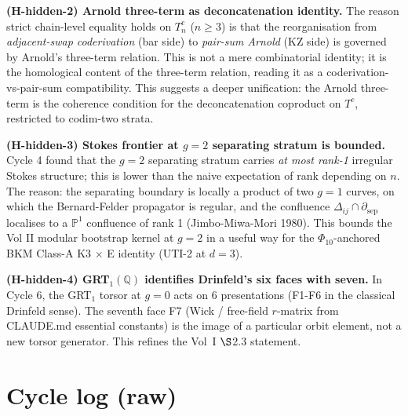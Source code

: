 \documentclass[12pt]{article}
\theoremstyle{definition}
\begin{document}
\textbf{(H-hidden-2) Arnold three-term as deconcatenation identity.}
The reason strict chain-level equality holds on $T^c_n$
($n \geq 3$) is that the reorganisation from
\emph{adjacent-swap coderivation} (bar side) to
\emph{pair-sum Arnold} (KZ side) is governed by Arnold's
three-term relation.  This is not a mere combinatorial
identity; it is the homological content of the three-term
relation, reading it as a coderivation-vs-pair-sum
compatibility.  This suggests a deeper unification: the
Arnold three-term is the coherence condition for the
deconcatenation coproduct on $T^c$, restricted to
codim-two strata.

\textbf{(H-hidden-3) Stokes frontier at $g = 2$ separating
stratum is bounded.}
Cycle 4 found that the $g = 2$ separating stratum carries
\emph{at most rank-1} irregular Stokes structure; this is
lower than the naive expectation of rank depending on $n$.
The reason: the separating boundary is locally a product
of two $g = 1$ curves, on which the Bernard-Felder propagator
is regular, and the confluence $\Delta_{ij} \cap \partial_{\mathrm{sep}}$
localises to a $\mathbb{P}^1$ confluence of rank 1
(Jimbo-Miwa-Mori 1980).  This bounds the Vol II modular
bootstrap kernel at $g = 2$ in a useful way for the
$\Phi_{10}$-anchored BKM Class-A K3$\,\times\,$E identity
(UTI-2 at $d = 3$).

\textbf{(H-hidden-4) GRT$_1(\mathbb{Q})$ identifies Drinfeld's
six faces with seven.}
In Cycle 6, the GRT$_1$ torsor at $g = 0$ acts on 6 presentations
(F1-F6 in the classical Drinfeld sense).  The seventh face F7
(Wick / free-field $r$-matrix from CLAUDE.md essential constants)
is the image of a particular orbit element, not a new torsor
generator.  This refines the Vol~I $\S$2.3 statement.

\section{Cycle log (raw)}
\label{sec:G2-log}
\end{document}
